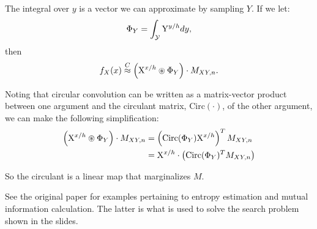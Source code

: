 \documentclass[10pt,letterpaper,oneside]{article}
\newcommand{\bind}{\circledast}
\newcommand{\analog}{\overset{C}{\approx}}
\newcommand{\domain}[1]{\mathcal{#1}}
\newcommand{\ssp}[1]{\mathrm{\uppercase{#1}}^{\lowercase{#1}/h}}
\begin{document}
The integral over $y$ is a vector we can approximate by sampling $Y$. If we let:
\begin{align}
  \Phi_{Y} = \int_{\domain{Y}}\ssp{Y}dy\text{,}
\end{align}
then
\begin{align}
  f_{X}(x) \analog \left(\ssp{X}\bind\Phi_{Y}\right) \cdot M_{XY,n}.
\end{align}

Noting that circular convolution can be written as a matrix-vector product between one argument and the circulant matrix, $\mathrm{Circ}(\cdot)$, of the other argument, we can make the following simplification:
\begin{align}
  \left(\ssp{X}\bind\Phi_{Y}\right) \cdot M_{XY,n} &= \left(\mathrm{Circ}(\Phi_{Y})\ssp{X}\right)^{T} M_{XY,n}\\
  &= \ssp{X}\cdot\left(\mathrm{Circ}(\Phi_{Y})^{T} M_{XY,n}\right)
\end{align}

So the circulant is a linear map that marginalizes $M$.

See the original paper for examples pertaining to entropy estimation and mutual information calculation.  The latter is what is used to solve the search problem shown in the slides.

\printbibliography
\end{document}
